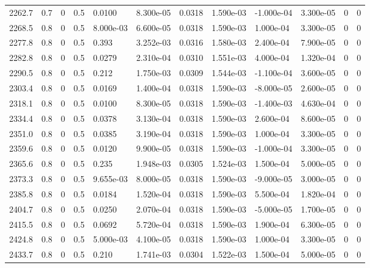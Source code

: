 \documentclass[preview]{standalone}
\begin{document}
{{{{{{\begin{tabular}{L{1.2cm}C{1.2cm} C{0.3cm}C{0.5cm} C{1.4cm}C{1.4cm} C{1.4cm}C{1.4cm} C{1.6cm}C{1.6cm} C{1.6cm}C{1.6cm}}
  2262.7  &   0.7  & 0     & 0.5 &  0.0100  & 8.300e-05  &  0.0318&   1.590e-03& -1.000e-04 & 3.300e-05   &  0 & 0  \\ 
  2268.5  &   0.8  & 0     & 0.5 &  8.000e-03  & 6.600e-05  &  0.0318&   1.590e-03& 1.000e-04 & 3.300e-05   &  0 & 0  \\ 
  2277.8  &   0.8  & 0     & 0.5 &  0.393  & 3.252e-03  &  0.0316&   1.580e-03& 2.400e-04 & 7.900e-05   &  0 & 0  \\ 
  2282.8  &   0.8  & 0     & 0.5 &  0.0279  & 2.310e-04  &  0.0310&   1.551e-03& 4.000e-04 & 1.320e-04   &  0 & 0  \\ 
  2290.5  &   0.8  & 0     & 0.5 &  0.212  & 1.750e-03  &  0.0309&   1.544e-03& -1.100e-04 & 3.600e-05   &  0 & 0  \\ 
  2303.4  &   0.8  & 0     & 0.5 &  0.0169  & 1.400e-04  &  0.0318&   1.590e-03& -8.000e-05 & 2.600e-05   &  0 & 0  \\ 
  2318.1  &   0.8  & 0     & 0.5 &  0.0100  & 8.300e-05  &  0.0318&   1.590e-03& -1.400e-03 & 4.630e-04   &  0 & 0  \\ 
  2334.4  &   0.8  & 0     & 0.5 &  0.0378  & 3.130e-04  &  0.0318&   1.590e-03& 2.600e-04 & 8.600e-05   &  0 & 0  \\ 
  2351.0  &   0.8  & 0     & 0.5 &  0.0385  & 3.190e-04  &  0.0318&   1.590e-03& 1.000e-04 & 3.300e-05   &  0 & 0  \\ 
  2359.6  &   0.8  & 0     & 0.5 &  0.0120  & 9.900e-05  &  0.0318&   1.590e-03& -1.000e-04 & 3.300e-05   &  0 & 0  \\ 
  2365.6  &   0.8  & 0     & 0.5 &  0.235  & 1.948e-03  &  0.0305&   1.524e-03& 1.500e-04 & 5.000e-05   &  0 & 0  \\ 
  2373.3  &   0.8  & 0     & 0.5 &  9.655e-03  & 8.000e-05  &  0.0318&   1.590e-03& -9.000e-05 & 3.000e-05   &  0 & 0  \\ 
  2385.8  &   0.8  & 0     & 0.5 &  0.0184  & 1.520e-04  &  0.0318&   1.590e-03& 5.500e-04 & 1.820e-04   &  0 & 0  \\ 
  2404.7  &   0.8  & 0     & 0.5 &  0.0250  & 2.070e-04  &  0.0318&   1.590e-03& -5.000e-05 & 1.700e-05   &  0 & 0  \\ 
  2415.5  &   0.8  & 0     & 0.5 &  0.0692  & 5.720e-04  &  0.0318&   1.590e-03& 1.900e-04 & 6.300e-05   &  0 & 0  \\ 
  2424.8  &   0.8  & 0     & 0.5 &  5.000e-03  & 4.100e-05  &  0.0318&   1.590e-03& 1.000e-04 & 3.300e-05   &  0 & 0  \\ 
  2433.7  &   0.8  & 0     & 0.5 &  0.210  & 1.741e-03  &  0.0304&   1.522e-03& 1.500e-04 & 5.000e-05   &  0 & 0  \\ 

\end{tabular}}}}}}}
\end{document}
